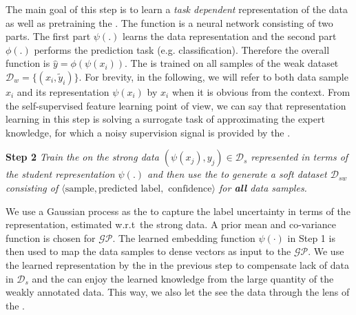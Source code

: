 The main goal of this step is to learn a \emph{task dependent} representation of the data as well as pretraining the \std. The \std function is a neural network consisting of two parts. The first part $\psi(.)$ learns the data representation and the second part $\phi(.)$ performs the prediction task (e.g. classification). Therefore the overall function is $\hat{y}=\phi(\psi(x_i))$. The \std is trained on all samples of the weak dataset $\mathcal{D}_w=\{(x_i, \tilde{y}_i)\}$. For brevity, in the following, we will refer to both data sample $x_i$ and its representation $\psi(x_i)$ by $x_i$ when it is obvious from the context. 
From the self-supervised feature learning point of view, we can say that representation learning in this step is solving a surrogate task of approximating the expert knowledge, for which a noisy supervision signal is provided by the \wa.  


\textbf{Step 2} \emph{Train the \tch on the strong data $(\psi(x_j),y_j) \in \mathcal{D}_s$ represented in terms of the student representation $\psi(.)$ and then use the \tch to generate a soft dataset $\mathcal{D}_{sw}$ consisting of $\langle \textrm{sample}, \textrm{predicted label}, \textrm{ confidence} \rangle$ for \textbf{all} data samples.} 

We use a Gaussian process as the \tch to capture the label uncertainty in terms of the \std representation, estimated w.r.t\ the strong data. A prior mean and co-variance function is chosen for $\mathcal{GP}$. The learned embedding function $\psi(\cdot)$ in Step 1 is then used to map the data samples to dense vectors as input to the $\mathcal{GP}$. 
We use the learned representation by the \std in the previous step to compensate lack of data in $\mathcal{D}_s$ and the \tch can enjoy the learned knowledge from the large quantity of the weakly annotated data. This way, we also let the \tch  see the data through the lens of the \std.

